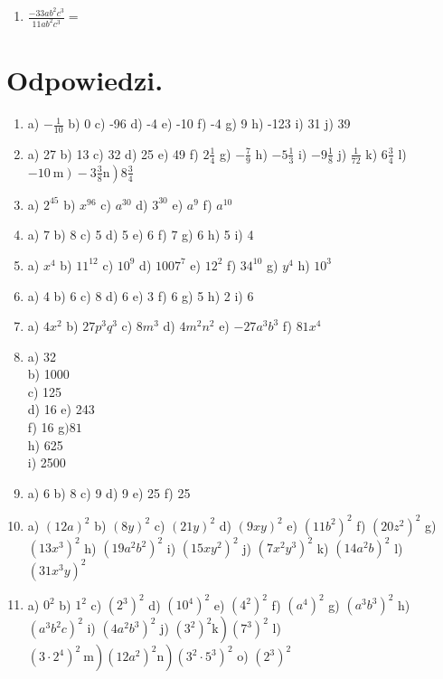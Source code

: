 \documentclass[10pt]{article}
\begin{document}
\begin{enumerate}
  \item \(\frac{-33 a b^{2} c^{3}}{11 a b^{2} c^{3}}=\)
\end{enumerate}

\section*{Odpowiedzi.}
\begin{enumerate}
  \item a) \(-\frac{1}{10}\) b) 0 c) -96 d) -4 e) -10 f) -4 g) 9 h) -123 i) 31 j) 39
  \item a) 27 b) 13 c) 32 d) 25 e) 49 f) \(2 \frac{1}{4}\) g) \(-\frac{7}{9}\) h) \(-5 \frac{1}{3}\) i) \(-9 \frac{1}{8}\) j) \(\frac{1}{72}\) k) \(6 \frac{3}{4}\) l) \(\left.\left.-10 \mathrm{~m}\right)-3 \frac{3}{8} \mathrm{n}\right) 8 \frac{3}{4}\)
  \item a) \(2^{45}\) b) \(x^{96}\) c) \(a^{30}\) d) \(3^{30}\) e) \(a^{9}\) f) \(a^{10}\)
  \item a) 7 b) 8 c) 5 d) 5 e) 6 f) 7 g) 6 h) 5 i) 4
  \item a) \(x^{4}\) b) \(11^{12}\) c) \(10^{9}\) d) \(1007^{7}\) e) \(12^{2}\) f) \(34^{10}\) g) \(y^{4}\) h) \(10^{3}\)
  \item a) 4 b) 6 c) 8 d) 6 e) 3 f) 6 g) 5 h) 2 i) 6
  \item a) \(4 x^{2}\) b) \(27 p^{3} q^{3}\) c) \(8 m^{3}\) d) \(4 m^{2} n^{2}\) e) \(-27 a^{3} b^{3}\) f) \(81 x^{4}\)
  \item a) 32\\
b) 1000\\
c) 125\\
d) 16 e) 243\\
f) 16 g\() 81\)\\
h) 625\\
i) 2500
  \item a) 6 b) 8 c) 9 d) 9 e) 25 f) 25
  \item a) \((12 a)^{2}\) b) \((8 y)^{2}\) c) \((21 y)^{2}\) d) \((9 x y)^{2}\) e) \(\left(11 b^{2}\right)^{2}\) f) \(\left(20 z^{2}\right)^{2}\) g) \(\left(13 x^{3}\right)^{2}\) h) \(\left(19 a^{2} b^{2}\right)^{2}\) i) \(\left(15 x y^{2}\right)^{2}\) j) \(\left(7 x^{2} y^{3}\right)^{2}\) k) \(\left(14 a^{2} b\right)^{2}\) l) \(\left(31 x^{3} y\right)^{2}\)
  \item a) \(0^{2}\) b) \(1^{2}\) c) \(\left(2^{3}\right)^{2}\) d) \(\left(10^{4}\right)^{2}\) e) \(\left(4^{2}\right)^{2}\) f) \(\left(a^{4}\right)^{2}\) g) \(\left(a^{3} b^{3}\right)^{2}\) h) \(\left(a^{3} b^{2} c\right)^{2}\) i) \(\left(4 a^{2} b^{3}\right)^{2}\) j) \(\left.\left(3^{2}\right)^{2} \mathrm{k}\right)\left(7^{3}\right)^{2}\) l) \(\left.\left.\left(3 \cdot 2^{4}\right)^{2} \mathrm{~m}\right)\left(12 a^{2}\right)^{2} \mathrm{n}\right)\left(3^{2} \cdot 5^{3}\right)^{2}\) o) \(\left(2^{3}\right)^{2}\)\\

\end{enumerate}
\end{document}
